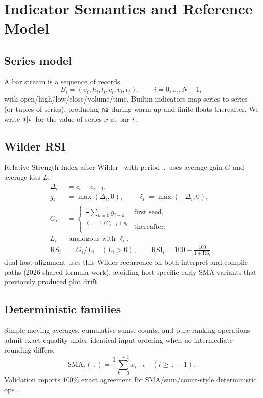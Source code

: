 \documentclass[11pt,a4paper]{article}
\begin{document}
\section{Indicator Semantics and Reference Model}
\label{sec:indicators}

\subsection{Series model}
A bar stream is a sequence of records
\begin{equation}
  B_i = (o_i,h_i,l_i,c_i,v_i,t_i),\qquad i=0,\ldots,N-1,
\end{equation}
with open/high/low/close/volume/time.
Builtin indicators map series to series (or tuples of series), producing
$\textsf{na}$ during warm-up and finite floats thereafter.
We write $x[i]$ for the value of series $x$ at bar $i$.

\subsection{Wilder RSI}
\label{sec:rsi}
Relative Strength Index after Wilder~\citep{wilder1978new} with period
$\period$ uses average gain $G$ and average loss $L$:
\begin{align}
  \Delta_i &= c_i - c_{i-1}, \\
  g_i &= \max(\Delta_i,0),\qquad
  \ell_i = \max(-\Delta_i,0), \\
  G_i &=
  \begin{cases}
    \frac{1}{\period}\sum_{k=0}^{\period-1} g_{i-k} & \text{first seed},\\
    \frac{(\period-1)G_{i-1}+g_i}{\period} & \text{thereafter},
  \end{cases}
  \label{eq:wilder-g}\\
  L_i &\text{ analogous with }\ell_i, \\
  \mathrm{RS}_i &= G_i / L_i \quad (L_i>0),\qquad
  \mathrm{RSI}_i = 100 - \frac{100}{1+\mathrm{RS}_i}.
  \label{eq:rsi}
\end{align}
\pyne{} dual-host alignment uses this Wilder recurrence on both interpret and
compile paths (2026 shared-formula work), avoiding host-specific early SMA
variants that previously produced plot drift.

\subsection{Deterministic families}
Simple moving averages, cumulative sums, counts, and pure ranking operations
admit exact equality under identical input ordering when no intermediate
rounding differs:
\begin{equation}
  \mathrm{SMA}_i(\period)
  = \frac{1}{\period}\sum_{k=0}^{\period-1} x_{i-k}
  \quad (i\ge \period-1).
\end{equation}
Validation reports $100\%$ exact agreement for SMA/sum/count-style
deterministic ops~\citep{pynescript2026}.
\end{document}
